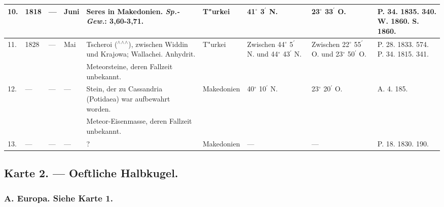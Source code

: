 \documentclass[a4paper, 8pt, oneside, polutonikogreek, german]{article}
\begin{document}
\begin{center}
\begin{longtable}{|p{3mm}|p{12mm}|p{5mm}|p{15mm}|p{25mm}|p{20mm}|p{13mm}|p{13mm}|p{13mm}|}
        10. & 1818 & --- & Juni & Seres in Makedonien. \emph{Sp.-Gew.}: 3,60-3,71. & T"urkei & 41$^\circ$ 3$^\prime$ N. & 23$^\circ$ 33$^\prime$ O. & P. 34. 1835. 340. W. 1860. S. 1860. \\ \hline
        11. & 1828 & --- & Mai & Tscheroi ($^\wedge$$^\wedge$$^\wedge$), zwischen Widdin und Krajowa; Wallachei. Anhydrit. & T"urkei & Zwischen 44$^\circ$ 5$^\prime$ N. und 44$^\circ$ 43$^\prime$ N. & Zwischen 22$^\circ$ 55$^\prime$ O. und 23$^\circ$ 50$^\prime$ O. & P. 28. 1833. 574. P. 34. 1815. 341. \\ \hline
          &   &   &   & Meteorsteine, deren Fallzeit unbekannt. &   &   &   &   \\ \hline
        12. & --- & --- & --- & Stein, der zu Cassandria (Potidaea) war aufbewahrt worden. & Makedonien & 40$^\circ$ 10$^\prime$ N. & 23$^\circ$ 20$^\prime$ O. & A. 4. 185. \\ \hline
          &   &   &   & Meteor-Eisenmasse, deren Fallzeit unbekannt. &   &   &   &   \\ \hline
        13. & --- & --- & --- & ? & Makedonien & --- & --- & P. 18. 1830. 190. \\ \hline
    \end{longtable}
\end{center}
\clearpage
\subsection{Karte 2. --- Oeftliche Halbkugel.}
\subsubsection{A. Europa. Siehe Karte 1.}
\end{document}
